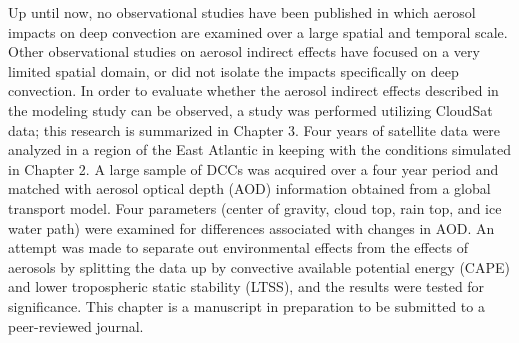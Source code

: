 \newpage\noindent
Up until now, no observational studies have been published in which aerosol impacts on deep convection are examined over a large spatial and temporal scale.  Other observational studies on aerosol indirect effects have focused on a very limited spatial domain, or did not isolate the impacts specifically on deep convection.  In order to evaluate whether the aerosol indirect effects described in the modeling study can be observed, a study was performed utilizing CloudSat data; this research is summarized in Chapter 3.  Four years of satellite data were analyzed in a region of the East Atlantic in keeping with the conditions simulated in Chapter 2.  A large sample of DCCs was acquired over a four year period and matched with aerosol optical depth (AOD) information obtained from a global transport model.  Four parameters (center of gravity, cloud top, rain top, and ice water path) were examined for differences associated with changes in AOD.  An attempt was made to separate out environmental effects from the effects of aerosols by splitting the data up by convective available potential energy (CAPE) and lower tropospheric static stability (LTSS), and the results were tested for significance.  This chapter is a manuscript in preparation to be submitted to a peer-reviewed journal.
